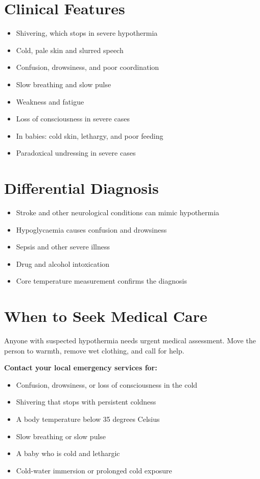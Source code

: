 \section*{Clinical Features}
\begin{itemize}
    \item Shivering, which stops in severe hypothermia
    \item Cold, pale skin and slurred speech
    \item Confusion, drowsiness, and poor coordination
    \item Slow breathing and slow pulse
    \item Weakness and fatigue
    \item Loss of consciousness in severe cases
    \item In babies: cold skin, lethargy, and poor feeding
    \item Paradoxical undressing in severe cases
\end{itemize}

\section*{Differential Diagnosis}
\begin{itemize}
    \item Stroke and other neurological conditions can mimic hypothermia
    \item Hypoglycaemia causes confusion and drowsiness
    \item Sepsis and other severe illness
    \item Drug and alcohol intoxication
    \item Core temperature measurement confirms the diagnosis
\end{itemize}

\section*{When to Seek Medical Care}
Anyone with suspected hypothermia needs urgent medical assessment. Move the person to warmth, remove wet clothing, and call for help.

\textbf{Contact your local emergency services for:}
\begin{itemize}
    \item Confusion, drowsiness, or loss of consciousness in the cold
    \item Shivering that stops with persistent coldness
    \item A body temperature below 35 degrees Celsius
    \item Slow breathing or slow pulse
    \item A baby who is cold and lethargic
    \item Cold-water immersion or prolonged cold exposure
\end{itemize}

